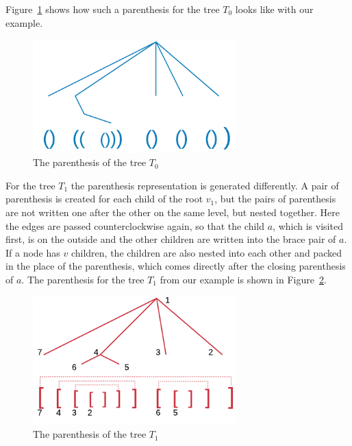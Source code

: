 \documentclass[a4paper]{scrartcl}
\begin{document}
Figure~\ref{fig:parenthesisOne} shows how such a parenthesis for the tree $T_0$ looks like with our example.


\begin{figure}[h]
	\centering
	\includegraphics[width=0.7\textwidth]{img/parenthesisOne}
	\caption{The parenthesis of the  tree $T_0$}
	\label{fig:parenthesisOne}
\end{figure}





For the tree $T_1$ the parenthesis representation is generated differently. A pair of parenthesis is created for each child of the root $v_1$, but the pairs of parenthesis are not written one after the other on the same level, but nested together. Here the edges are passed counterclockwise again, so that the child $a$, which is visited first, is on the outside and the other children are written into the brace pair of $a$. If a node has $v$ children, the children are also nested into each other and packed in the place of the parenthesis, which comes directly after the closing parenthesis of $a$. The parenthesis for the tree $T_1$ from our example is shown in Figure~\ref{fig:parenthesisTwo}.


\begin{figure}[h]
	\centering
	\includegraphics[width=0.7\textwidth]{img/parenthesisTwo}
	\caption{The parenthesis of the  tree $T_1$}
	\label{fig:parenthesisTwo}
\end{figure}
\end{document}
